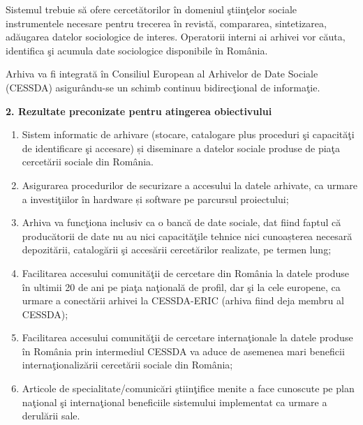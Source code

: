 \documentclass[a4paper]{article}
\newcommand\liststyleLv{%
\renewcommand\theenumi{\arabic{enumi}}
\renewcommand\theenumii{\arabic{enumii}}
\renewcommand\theenumiii{\arabic{enumiii}}
\renewcommand\theenumiv{\arabic{enumiv}}
\renewcommand\labelenumi{\theenumi.}
\renewcommand\labelenumii{\theenumii.}
\renewcommand\labelenumiii{\theenumiii.}
\renewcommand\labelenumiv{\theenumiv.}
}
\begin{document}
{{
Sistemul trebuie s\u{a} ofere cercet\u{a}torilor \^in domeniul \c{s}tiin\c{t}elor sociale instrumentele necesare pentru
trecerea \^in revist\u{a}, compararea, sintetizarea, ad\u{a}ugarea datelor sociologice de interes. Operatorii interni
ai arhivei vor c\u{a}uta, identifica \c{s}i acumula date sociologice disponibile \^in Rom\^ania.}

{
Arhiva va fi integrat\u{a} \^in Consiliul European al Arhivelor de Date Sociale (CESSDA) asigur\^andu-se un schimb
continuu bidirec\c{t}ional de informa\c{t}ie.}

\bigskip
{\bfseries
2. Rezultate preconizate pentru atingerea obiectivului}

\liststyleLv
\begin{enumerate}
\item {
Sistem informatic de arhivare (stocare, catalogare plus proceduri \c{s}i capacit\u{a}\c{t}i de identificare \c{s}i
accesare) \foreignlanguage{romanian}{\c{s}}i diseminare a datelor sociale produse de pia\c{t}a cercet\u{a}rii sociale
din Rom\^ania.}
\item {
Asigurarea procedurilor de securizare a accesului la datele arhivate, ca urmare a investi\c{t}iilor \^in hardware
\foreignlanguage{romanian}{\c{s}}i software pe parcursul proiectului;}
\item {
\foreignlanguage{romanian}{Arhiva }va func\c{t}iona inclusiv ca o banc\u{a} de date sociale, dat fiind faptul c\u{a}
produc\u{a}torii de date nu au nici capacit\u{a}\c{t}ile tehnice nici \foreignlanguage{romanian}{cunoa\c{s}terea}
necesar\u{a} depozit\u{a}rii, catalog\u{a}rii \c{s}i acces\u{a}rii cercet\u{a}rilor realizate, pe termen lung;}
\item {
Facilitarea accesului comunit\u{a}\c{t}ii de cercetare din Rom\^ania la datele produse \^in ultimii 20 de ani pe
pia\c{t}a na\c{t}ional\u{a} de profil, dar \c{s}i la cele europene, ca urmare a conect\u{a}rii arhivei la CESSDA-ERIC
(arhiva fiind deja membru al CESSDA);}
\item {
Facilitarea accesului comunit\u{a}\c{t}ii de cercetare interna\c{t}ionale la datele produse \^in Rom\^ania prin
intermediul CESSDA va aduce de asemenea mari beneficii interna\c{t}ionaliz\u{a}rii cercet\u{a}rii sociale din
Rom\^ania;}
\item {
Articole de specialitate/comunic\u{a}ri \c{s}tiin\c{t}ifice menite a face cunoscute pe plan na\c{t}ional \c{s}i
interna\c{t}ional beneficiile sistemului implementat ca urmare a derul\u{a}rii sale.}
\end{enumerate}

}
\end{document}
